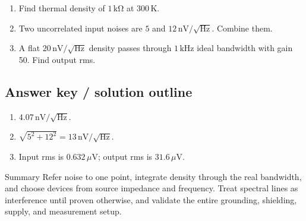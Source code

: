 \documentclass[10pt,letterpaper]{article}
\begin{document}
\begin{enumerate}
  \item Find thermal density of $1\,\mathrm{k\Omega}$ at $300\,\mathrm{K}$.
  \item Two uncorrelated input noises are $5$ and $12\,\mathrm{nV}/\sqrt{\mathrm{Hz}}$. Combine them.
  \item A flat $20\,\mathrm{nV}/\sqrt{\mathrm{Hz}}$ density passes through $1\,\mathrm{kHz}$ ideal bandwidth with gain 50. Find output rms.
\end{enumerate}\subsection{Answer key / solution outline}
\begin{enumerate}
  \item $4.07\,\mathrm{nV}/\sqrt{\mathrm{Hz}}$.
  \item $\sqrt{5^2+12^2}=13\,\mathrm{nV}/\sqrt{\mathrm{Hz}}$.
  \item Input rms is $0.632\,\mu\mathrm{V}$; output rms is $31.6\,\mu\mathrm{V}$.
\end{enumerate}\begin{CornellSummaryBox}{Summary}
Refer noise to one point, integrate density through the real bandwidth, and choose devices from source impedance and frequency. Treat spectral lines as interference until proven otherwise, and validate the entire grounding, shielding, supply, and measurement setup.
\end{CornellSummaryBox}
\end{document}
